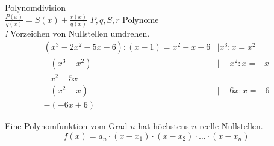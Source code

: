 
\begin{KR}{Polynomdivision}\\
    $\frac{P(x)}{q(x)} = S(x) + \frac{r(x)}{q(x)}$ \qquad $P,q,S,r$ Polynome\\
\emph{!} Vorzeichen von Nullstellen umdrehen.
\tcblower
$$
\begin{array}{cc}
\left(x^3-2 x^2-5 x-6\right):(x-1)=x^2-x-6 & \mid x^3: x=x^2 \\
-\left(x^3-x^2\right) & \mid-x^2: x=-x \\
-x^2-5 x & \\
-\left(x^2-x\right) & \mid-6 x: x=-6 \\
\hline-(-6 x+6) &
\end{array}
$$

Eine Polynomfunktion vom Grad $n$ hat höchstens $n$ reelle Nullstellen.
$$
f(x)=a_n \cdot\left(x-x_1\right) \cdot\left(x-x_2\right) \cdot \ldots \cdot\left(x-x_n\right)
$$
\end{KR}


